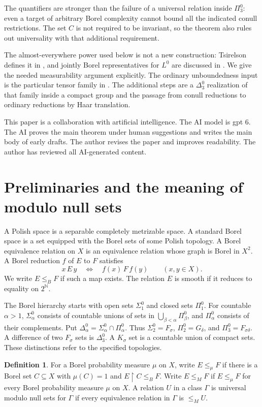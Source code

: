 \documentclass[11pt]{article}
\theoremstyle{definition}
\newtheorem{definition}[theorem]{Definition}
\theoremstyle{remark}
\newcommand{\N}{\mathbb N}
\begin{document}
The quantifiers are stronger than the failure of a universal relation
inside $\Pi^0_3$: even a target of arbitrary Borel complexity cannot bound
all the indicated conull restrictions. The set $C$ is not required to be
invariant, so the theorem also rules out universality with that additional
requirement.

The almost-everywhere power used below is not a new construction:
Tsirelson defines it in \cite[Section 1, p.~3]{Tsirelson}, and jointly
Borel representatives for $L^0$ are discussed in
\cite[Section 0]{GTW}. We give the needed measurability argument explicitly.
The ordinary unboundedness input is the particular tensor family in
\cite[Corollary 6.1 and its proof]{Wang}. The additional steps are a
$\Delta^0_3$ realization of that family inside a compact group and the
passage from conull reductions to ordinary reductions by Haar translation.

This paper is a collaboration with artificial intelligence. The AI model is gpt 6. The AI proves the main theorem under human suggestions and writes the main body of early drafts. The author revises the paper and improves readability. The author has reviewed all AI-generated content.

\section{Preliminaries and the meaning of modulo null sets}
A Polish space is a separable completely metrizable space. A standard Borel
space is a set equipped with the Borel sets of some Polish topology.
A Borel equivalence relation on $X$ is an equivalence relation whose graph
is Borel in $X^2$. A Borel reduction $f$ of $E$ to $F$ satisfies
\[
 x\,E\,y\quad\Longleftrightarrow\quad f(x)\,F\,f(y)
 \qquad(x,y\in X).
\]
We write $E\leq_B F$ if such a map exists. The relation $E$ is smooth
if it reduces to equality on $2^{\N}$.

The Borel hierarchy starts with open sets $\Sigma^0_1$ and closed sets
$\Pi^0_1$. For countable $\alpha>1$, $\Sigma^0_\alpha$ consists of countable
unions of sets in $\bigcup_{\beta<\alpha}\Pi^0_\beta$, and $\Pi^0_\alpha$
consists of their complements. Put
$\Delta^0_\alpha=\Sigma^0_\alpha\cap\Pi^0_\alpha$.
Thus $\Sigma^0_2=F_\sigma$, $\Pi^0_2=G_\delta$, and
$\Pi^0_3=F_{\sigma\delta}$. A difference of two $F_\sigma$ sets is
$\Delta^0_3$. A $K_\sigma$ set is a countable union of compact sets.
These distinctions refer to the specified topologies.

\begin{definition}
For a Borel probability measure $\mu$ on $X$, write $E\leq_\mu F$ if
there is a Borel set $C\subseteq X$ with $\mu(C)=1$ and
$E\mathbin{\upharpoonright}C\leq_B F$. Write $E\leq_M F$ if
$E\leq_\mu F$ for every Borel probability measure $\mu$ on $X$.
A relation $U$ in a class $\Gamma$ is universal modulo null sets for
$\Gamma$ if every equivalence relation in $\Gamma$ is $\leq_M U$.
\end{definition}
\end{document}
